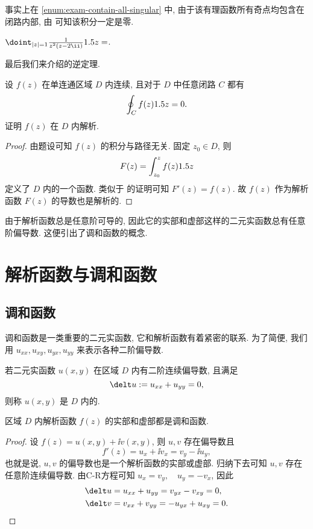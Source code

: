 事实上在 \ref{enum:exam-contain-all-singular} 中, 由于该有理函数所有奇点均包含在闭路内部, 由 可知该积分一定是零.

\begin{exercise}
  $\doint_{\abs{z}=1}\frac1{z^2(z-2\ii)}\d z=$\fillblank{}.
\end{exercise}

最后我们来介绍\thmCG 的逆定理.
\begin{example}[莫累拉定理]
  设 $f(z)$ 在单连通区域 $D$ 内连续, 且对于 $D$ 中任意闭路 $C$ 都有
  \[
    \oint_C f(z)1.5 z=0.
  \]
  证明 $f(z)$ 在 $D$ 内解析.
\end{example}

\begin{proof}
  由题设可知 $f(z)$ 的积分与路径无关.
  固定 $z_0\in D$, 则
  \[
    F(z)=\int_{z_0}^zf(z)1.5 z
  \]
  定义了 $D$ 内的一个函数.
  类似于 的证明可知 $F'(z)=f(z)$.
  故 $f(z)$ 作为解析函数 $F(z)$ 的导数也是解析的.
\end{proof}

由于解析函数总是任意阶可导的, 因此它的实部和虚部这样的二元实函数总有任意阶偏导数.
这便引出了调和函数的概念.



\section{解析函数与调和函数}

\subsection{调和函数}

调和函数是一类重要的二元实函数, 它和解析函数有着紧密的联系.
为了简便, 我们用 $u_{xx},u_{xy},u_{yx},u_{yy}$ 来表示各种二阶偏导数.

\begin{definition}
  若二元实函数 $u(x,y)$ 在区域 $D$ 内有二阶连续偏导数, 且满足
  \[
    \delt u:=u_{xx}+u_{yy}=0,
  \]
  则称 $u(x,y)$ 是 $D$ 内的.
\end{definition}

\begin{theorem}
  区域 $D$ 内解析函数 $f(z)$ 的实部和虚部都是调和函数.
\end{theorem}

\begin{proof}
  设 $f(z)=u(x,y)+\ii v(x,y)$, 则 $u,v$ 存在偏导数且
  \[
    f'(z)=u_x+\ii v_x=v_y-\ii u_y,
  \]
  也就是说, $u,v$ 的偏导数也是一个解析函数的实部或虚部.
  归纳下去可知 $u,v$ 存在任意阶连续偏导数.
  由C-R方程可知 $u_x=v_y,\quad u_y=-v_x$, 因此
  \begin{align*}
    \delt u&=u_{xx}+u_{yy}=v_{yx}-v_{xy}=0,\\
    \delt v&=v_{xx}+v_{yy}=-u_{yx}+u_{xy}=0.\qedhere
  \end{align*}
\end{proof}



